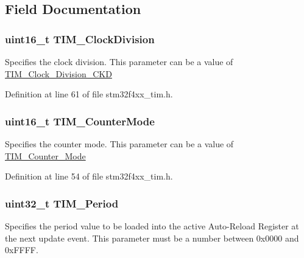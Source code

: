 \subsection{Field Documentation}
\hypertarget{struct_t_i_m___time_base_init_type_def_a2142bf86a7116c8c98ab015d5606fc98}{
\subsubsection[{T\-I\-M\-\_\-\-Clock\-Division}]{\setlength{\rightskip}{0pt plus 5cm}uint16\-\_\-t T\-I\-M\-\_\-\-Clock\-Division}}\label{struct_t_i_m___time_base_init_type_def_a2142bf86a7116c8c98ab015d5606fc98}
Specifies the clock division. This parameter can be a value of \hyperlink{group___t_i_m___clock___division___c_k_d}{T\-I\-M\-\_\-\-Clock\-\_\-\-Division\-\_\-\-C\-K\-D} 

Definition at line 61 of file stm32f4xx\-\_\-tim.\-h.

\hypertarget{struct_t_i_m___time_base_init_type_def_adfc97c66bfce30e74ce779ab04c156e9}{
\subsubsection[{T\-I\-M\-\_\-\-Counter\-Mode}]{\setlength{\rightskip}{0pt plus 5cm}uint16\-\_\-t T\-I\-M\-\_\-\-Counter\-Mode}}\label{struct_t_i_m___time_base_init_type_def_adfc97c66bfce30e74ce779ab04c156e9}
Specifies the counter mode. This parameter can be a value of \hyperlink{group___t_i_m___counter___mode}{T\-I\-M\-\_\-\-Counter\-\_\-\-Mode} 

Definition at line 54 of file stm32f4xx\-\_\-tim.\-h.

\hypertarget{struct_t_i_m___time_base_init_type_def_a642ee05352126af48248167939742034}{
\subsubsection[{T\-I\-M\-\_\-\-Period}]{\setlength{\rightskip}{0pt plus 5cm}uint32\-\_\-t T\-I\-M\-\_\-\-Period}}\label{struct_t_i_m___time_base_init_type_def_a642ee05352126af48248167939742034}
Specifies the period value to be loaded into the active Auto-\/\-Reload Register at the next update event. This parameter must be a number between 0x0000 and 0x\-F\-F\-F\-F. 

